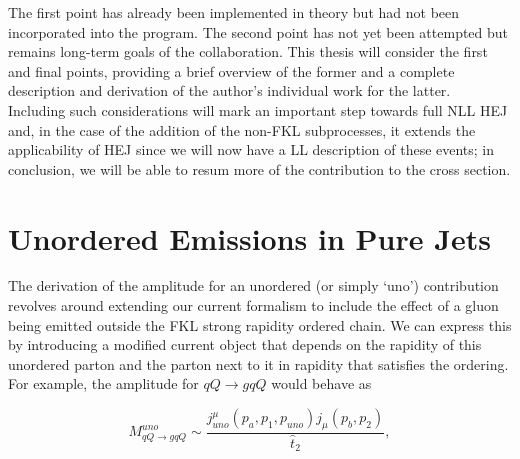 The first point has already been implemented in theory but had not been incorporated into the program. The second point has not yet been attempted but remains long-term goals of the collaboration. This thesis will consider the first and final points, providing a brief overview of the former and a complete description and derivation of the author's individual work for the latter. Including such considerations will mark an important step towards full NLL HEJ and, in the case of the addition of the non-FKL subprocesses, it extends the applicability of HEJ since we will now have a LL description of these events; in conclusion, we will be able to resum more of the contribution to the cross section. 

\section{Unordered Emissions in Pure Jets}
The derivation of the amplitude for an unordered (or simply `uno') contribution revolves around extending our current formalism to include the effect of a gluon being emitted outside the FKL strong rapidity ordered chain. We can express this by introducing a modified current object that depends on the rapidity of this unordered parton and the parton next to it in rapidity that satisfies the ordering. For example, the amplitude for $qQ \to gqQ$ would behave as

\begin{equation}
M_{qQ \to gqQ}^{uno} \sim \frac{j^\mu_{uno}(p_a,p_1,p_{uno})j_\mu(p_b,p_2)}{\hat{t}_2},
\label{eqn:uno}
\end{equation}

